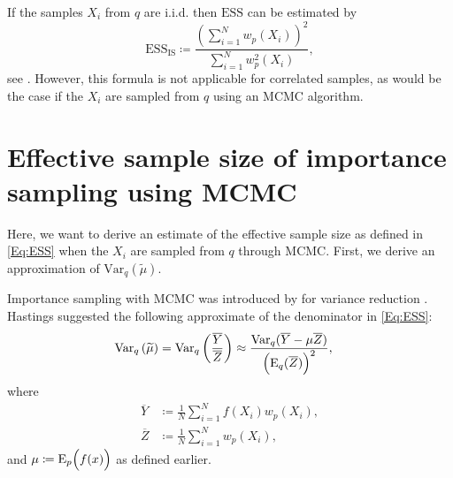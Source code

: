 \documentclass{amsart}
\newcommand{\Var}{\mathrm{Var}}
\theoremstyle{plain}%
\begin{document}
If the samples $X_i$ from  $q$ are i.i.d. then $\textrm{ESS}$ can be estimated by 
\begin{equation}
\mathrm{ESS_{IS}} \coloneqq
\frac{(\sum_{i=1}^N w_p(X_i))^2}{\sum_{i=1}^N w^2_p(X_i)},
\label{Eq:ESS_aprox}
\end{equation}
see \citep{Owen_2013}. 
However, this formula is not applicable for correlated samples, as would be the case if the $X_i$ are sampled
from $q$ using an MCMC algorithm.

\section{Effective sample size of importance sampling using MCMC}
\label{sec:ESS}

Here, we want to derive an estimate of the effective sample size as defined in \cref{Eq:ESS} 
when the $X_i$ are sampled from $q$ through MCMC. First, we derive an approximation of $\Var_q(\widetilde{\mu})$.

Importance sampling with MCMC was introduced by \citep{Hastings_1970} for variance reduction \citep{Bhattacharya_2008}. Hastings \citep{Hastings_1970}
suggested the following approximate of the denominator in \cref{Eq:ESS}:
\begin{align}
\Var_q \left (\widetilde{\mu} \right ) = \Var_q\left ( \frac{\overline{Y}}{\overline{Z}} \right )
& \approx 
\frac{%
  \Var_q(\overline{Y}-\mu\overline{Z})}{%
  \Bigl(\mathrm{E}_q(\overline{Z})\Bigr)^2%
},
\label{Eq:est_Var_1}
\end{align}
where
\begin{align}
\overline{Y} & \coloneqq \frac{1}{N}\sum_{i=1}^N f(X_i)w_p(X_i),   \\
\overline{Z} & \coloneqq \frac{1}{N}\sum_{i=1}^N w_p(X_i), 
\end{align}
and $\mu\coloneqq\mathrm{E}_p\Bigl(f(x)\Bigr)$ as defined earlier.
\end{document}
